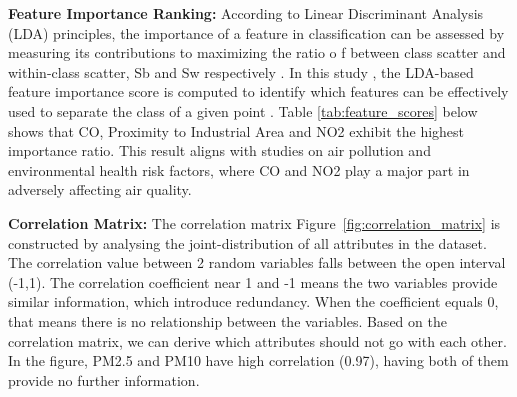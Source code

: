\documentclass[10pt,twocolumn]{article}
\begin{document}
\textbf{Feature Importance Ranking:} According to Linear Discriminant Analysis (LDA) principles, the importance of a feature in classification can be assessed by measuring its contributions to maximizing the ratio o f between class scatter and within-class scatter, Sb and Sw respectively \cite{song2010}.  In this study , the LDA-based feature importance score is computed to identify which features can be effectively used to separate the class of a given point \cite{song2010}. Table \ref{tab:feature_scores}  below shows that CO, Proximity to Industrial Area and NO2 exhibit the highest importance ratio. This result aligns with studies on air pollution and environmental health risk factors, where CO and NO2 play a major part in adversely affecting air quality. \cite{bikis2023}

\begin{table}[!ht]
\centering
\caption{\textit{Feature Scores of Various Environmental Factors}}
\label{tab:feature_scores}
\renewcommand{\arraystretch}{1.3} %
\label{tab:feature_scores}
\end{table}

\textbf{Correlation Matrix:} The correlation matrix Figure~\ref{fig:correlation_matrix} is constructed by analysing the joint-distribution of all attributes in the dataset. The correlation value between 2 random variables falls between the open interval (-1,1). The correlation coefficient near 1 and -1 means the two variables provide similar information, which introduce redundancy. When the coefficient equals 0, that means there is no relationship between the variables. Based on the correlation matrix, we can derive which attributes should not go with each other. In the figure, PM2.5 and PM10 have high correlation (0.97), having both of them provide no further information. 
\end{document}

